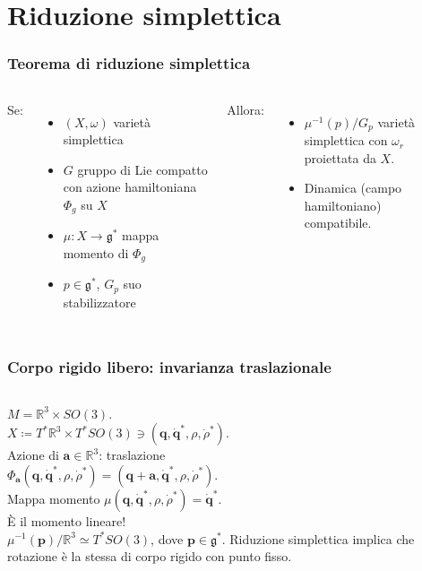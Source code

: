 \documentclass[]{beamer}
\newcommand{\R}{\mathbb{R}}
\renewcommand{\vec}[1]{\boldsymbol{#1}}
\newcommand{\defeq}{\coloneq}
\begin{document}
\section{Riduzione simplettica}

\begin{frame}
  \frametitle{Teorema di riduzione simplettica}
  \begin{columns}
    Se:
    \begin{itemize}
      \item $(X, \omega)$ varietà simplettica
      \item $G$ gruppo di Lie compatto con azione hamiltoniana $\Phi_g$ su $X$
      \item $\mu: X \to \mathfrak{g}^*$ mappa momento di $\Phi_g$
      \item $p \in \mathfrak{g^*}$, $G_p$ suo stabilizzatore
    \end{itemize}
    Allora:
    \begin{itemize}
      \item $\mu^{-1}(p)/G_p$ \alert{varietà simplettica} con $\omega_r$ proiettata da $X$.
      \item Dinamica (campo hamiltoniano) compatibile.
    \end{itemize}
      \begin{center}
            
      \end{center}
  \end{columns}
\end{frame}

\begin{frame}
\frametitle{Corpo rigido libero: invarianza traslazionale}
\begin{columns}
  $M = \R^3 \times SO(3)$.\\ $X \defeq T^* \R^3 \times T^*SO(3) \ni (\vec{q}, \vec{\dot{q}}^*, \rho, \dot{\rho}^*)$.\\[5pt]
  Azione di $\vec{a} \in \R^3$: traslazione\\ $\Phi_{\vec{a}}(\vec{q}, \vec{\dot{q}}^*, \rho, \dot{\rho}^*) = (\vec{q}+\vec{a}, \vec{\dot{q}}^*, \rho, \dot{\rho}^*)$.\\[5pt]
  Mappa momento $\mu(\vec{q}, \vec{\dot{q}}^*, \rho, \dot{\rho}^*) = \vec{\dot{q}}^*$.\\ È il \alert{momento lineare}!\\[11pt]
  $\mu^{-1}(\vec{p})/\R^3 \simeq T^* SO(3)$, dove $\vec{p} \in \mathfrak{g}^*$. Riduzione simplettica implica che rotazione è la stessa di corpo rigido con punto fisso.
    \begin{center}
          
    \end{center}
\end{columns}
\end{frame}
\end{document}
